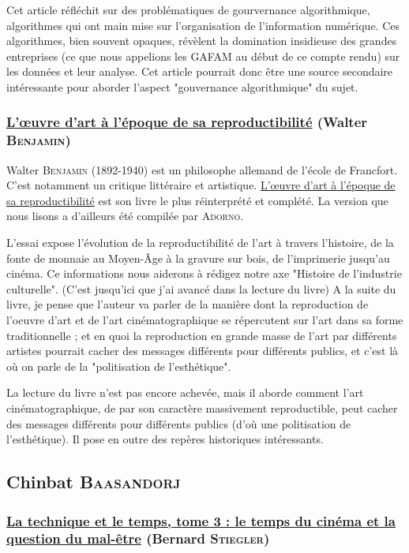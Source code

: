 \documentclass[a4paper,10pt]{article}
\begin{document}
Cet article réfléchit sur des problématiques de gourvernance algorithmique, algorithmes qui ont main mise sur l'organisation de l'information numérique. Ces algorithmes, bien souvent opaques, révèlent la domination insidieuse des grandes entreprises (ce que nous appelions les GAFAM au début de ce compte rendu) sur les données et leur analyse. Cet article pourrait donc être une source secondaire intéressante pour aborder l'aspect "gouvernance algorithmique" du sujet.

\subsubsection{\underline{L'\oe{}uvre d'art à l'époque de sa reproductibilité} (Walter \textsc{Benjamin})}

Walter \textsc{Benjamin} (1892-1940)  est un philosophe allemand de l'école de Francfort. C'est notamment un critique littéraire et artistique. \underline{L'\oe{}uvre d'art à l'époque de sa reproductibilité} est son livre le plus réinterprété et complété. La version que nous lisons a d'ailleurs été compilée par \textsc{Adorno}.

L'essai expose l'évolution de la reproductibilité de l'art à travers l'histoire, de la fonte de monnaie au Moyen-Âge à la gravure sur bois, de l'imprimerie jusqu'au cinéma.
Ce informations nous aiderons à rédigez notre axe "Histoire de l'industrie culturelle". (C'est jusqu'ici que j'ai avancé dans la lecture du livre)
A la suite du livre, je pense que l'auteur va parler de la manière dont la reproduction de l’oeuvre d’art et de l'art cinématographique se répercutent sur l’art dans sa forme traditionnelle ; et en quoi la reproduction en grande masse de l'art par différents artistes pourrait cacher des messages différents pour différents publics, et c'est là où on parle de la "politisation de l'esthétique".

La lecture du livre n'est pas encore achevée, mais il aborde comment l'art cinématographique, de par son caractère massivement reproductible, peut cacher des messages différents pour différents publics (d'où une politisation de l'esthétique). Il pose en outre des repères historiques intéressants.

\subsection{Chinbat \textsc{Baasandorj}}

\subsubsection{\underline{La technique et le temps, tome 3 : le temps du cinéma et la question du mal-être} (Bernard \textsc{Stiegler})}
\end{document}
